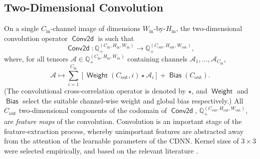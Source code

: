 \documentclass[journal]{IEEEtran}
\DeclareMathOperator\convol{\mathsf{Conv2d}}
\DeclareMathOperator\weight{\mathsf{Weight}}
\DeclareMathOperator\bias{\mathsf{Bias}}
\begin{document}
\subsection{Two-Dimensional Convolution}
On a single $C_\text{in}$-channel image of dimensions
$W_\text{in}$-by-$H_\text{in}$, the two-dimensional convolution operator
$\convol$ is such that
\begin{equation}
    \convol \colon
        \mathbb{Q}^{\left( C_\text{in}, H_\text{in}, W_\text{in} \right)}_+ \to
        \mathbb{Q}^{\left( C_\text{out}, H_\text{out}, W_\text{out} \right)}_+,
\end{equation}
where, for all tensors $\mathcal{A} \in \mathbb{Q}^{\left( C_\text{in},
H_\text{in}, W_\text{in} \right)}_+$ containing channels $\mathcal{A}_1, \ldots,
\mathcal{A}_{C_\text{in}}$,
\begin{equation}
    \mathcal{A} \mapsto \sum_{i=1}^{C_\text{in}} \left[
            \weight\left(C_\text{out}, i\right) \star \mathcal{A}_i
        \right] + \bias(C_\text{out}).
    \label{eqn:convolution}
\end{equation}
(The convolutional cross-correlation operator is denoted by $\star$, and
$\weight$ and $\bias$ select the suitable channel-wise weight and global bias
respectively.) All $C_\text{out}$ two-dimensional components of the codomain of
$\convol$, $\mathbb{Q}^{\left( C_\text{out}, H_\text{out}, W_\text{out}
\right)}_+$, are \emph{feature maps} of the convolution.  Convolution is an
important stage of the feature-extraction process, whereby unimportant features
are abstracted away from the attention of the learnable parameters of the CDNN.
Kernel sizes of $3 \times 3$ were selected empirically, and based on the
relevant literature \cite{Wang:2016}.
\end{document}
